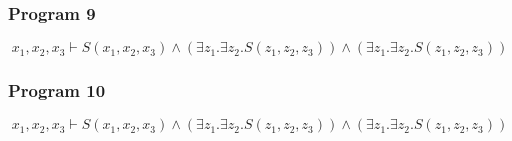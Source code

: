 \subsubsection{Program 9}
$$x_1, x_2, x_3 \vdash S(x_1, x_2,x_3) \land (\exists z_1.\exists z_2 . S(z_1,z_2,z_3)) \land (\exists z_1.\exists z_2.S(z_1,z_2,z_3))$$

\subsubsection{Program 10}
$$x_1, x_2, x_3 \vdash S(x_1, x_2, x_3) \land (\exists z_1.\exists z_2.S(z_1,z_2,z_3)) \land (\exists z_1.\exists z_2.S(z_1,z_2,z_3))$$

